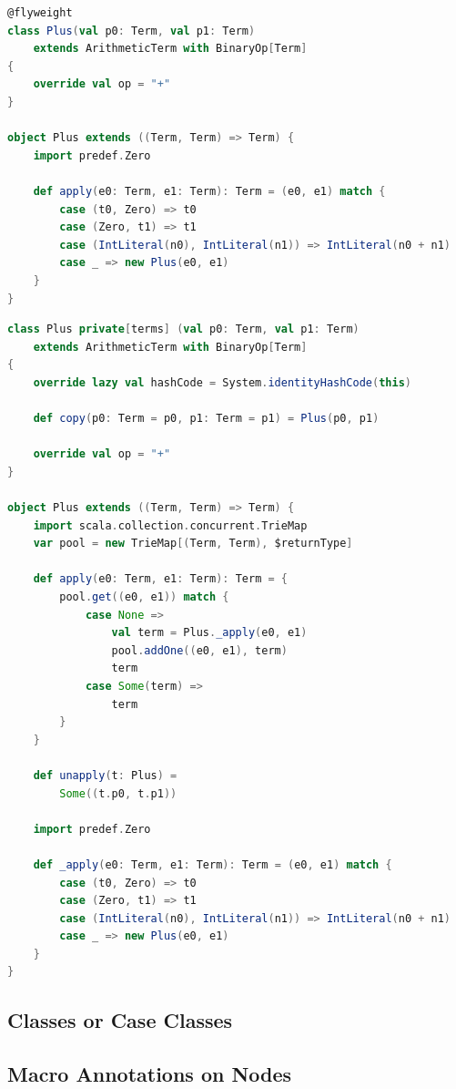 \documentclass[11pt]{article}
\begin{document}
    \begin{lstlisting}[language=Scala, caption=Input code given to the macro.]
@flyweight
class Plus(val p0: Term, val p1: Term)
    extends ArithmeticTerm with BinaryOp[Term]
{
    override val op = "+"
}

object Plus extends ((Term, Term) => Term) {
    import predef.Zero

    def apply(e0: Term, e1: Term): Term = (e0, e1) match {
        case (t0, Zero) => t0
        case (Zero, t1) => t1
        case (IntLiteral(n0), IntLiteral(n1)) => IntLiteral(n0 + n1)
        case _ => new Plus(e0, e1)
    }
}        
    \end{lstlisting}

    \begin{lstlisting}[language=Scala, caption=Output code generated by our macro.]
class Plus private[terms] (val p0: Term, val p1: Term)
    extends ArithmeticTerm with BinaryOp[Term]
{
    override lazy val hashCode = System.identityHashCode(this)

    def copy(p0: Term = p0, p1: Term = p1) = Plus(p0, p1)

    override val op = "+"
}

object Plus extends ((Term, Term) => Term) {
    import scala.collection.concurrent.TrieMap
    var pool = new TrieMap[(Term, Term), $returnType]

    def apply(e0: Term, e1: Term): Term = {
        pool.get((e0, e1)) match {
            case None => 
                val term = Plus._apply(e0, e1)
                pool.addOne((e0, e1), term)
                term
            case Some(term) => 
                term
        }
    }

    def unapply(t: Plus) =
        Some((t.p0, t.p1))

    import predef.Zero

    def _apply(e0: Term, e1: Term): Term = (e0, e1) match {
        case (t0, Zero) => t0
        case (Zero, t1) => t1
        case (IntLiteral(n0), IntLiteral(n1)) => IntLiteral(n0 + n1)
        case _ => new Plus(e0, e1)
    }
}       
    \end{lstlisting}

    \subsection{Classes or Case Classes}

    \subsection{Macro Annotations on Nodes}
\end{document}
